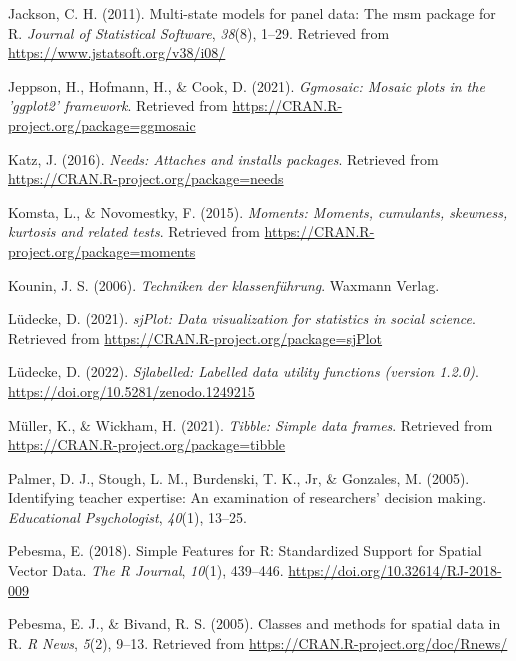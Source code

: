 \documentclass[
  man]{apa6}
\newlength{\cslhangindent}
\newlength{\cslentryspacingunit} %
\newenvironment{CSLReferences}[2] %
 {%
  \setlength{\parindent}{0pt}
  \ifodd #1
  \let\oldpar\par
  \def\par{\hangindent=\cslhangindent\oldpar}
  \fi
  \setlength{\parskip}{#2\cslentryspacingunit}
 }%
 {}
\begin{document}
\begin{CSLReferences}{1}{0}
\leavevmode{}%
Jackson, C. H. (2011). Multi-state models for panel data: The {msm} package for {R}. \emph{Journal of Statistical Software}, \emph{38}(8), 1--29. Retrieved from \url{https://www.jstatsoft.org/v38/i08/}

\leavevmode{}%
Jeppson, H., Hofmann, H., \& Cook, D. (2021). \emph{Ggmosaic: Mosaic plots in the 'ggplot2' framework}. Retrieved from \url{https://CRAN.R-project.org/package=ggmosaic}

\leavevmode{}%
Katz, J. (2016). \emph{Needs: Attaches and installs packages}. Retrieved from \url{https://CRAN.R-project.org/package=needs}

\leavevmode{}%
Komsta, L., \& Novomestky, F. (2015). \emph{Moments: Moments, cumulants, skewness, kurtosis and related tests}. Retrieved from \url{https://CRAN.R-project.org/package=moments}

\leavevmode{}%
Kounin, J. S. (2006). \emph{Techniken der klassenf{ü}hrung}. Waxmann Verlag.

\leavevmode{}%
Lüdecke, D. (2021). \emph{sjPlot: Data visualization for statistics in social science}. Retrieved from \url{https://CRAN.R-project.org/package=sjPlot}

\leavevmode{}%
Lüdecke, D. (2022). \emph{Sjlabelled: Labelled data utility functions (version 1.2.0)}. \url{https://doi.org/10.5281/zenodo.1249215}

\leavevmode{}%
Müller, K., \& Wickham, H. (2021). \emph{Tibble: Simple data frames}. Retrieved from \url{https://CRAN.R-project.org/package=tibble}

\leavevmode{}%
Palmer, D. J., Stough, L. M., Burdenski, T. K., Jr, \& Gonzales, M. (2005). Identifying teacher expertise: An examination of researchers' decision making. \emph{Educational Psychologist}, \emph{40}(1), 13--25.

\leavevmode{}%
Pebesma, E. (2018). {Simple Features for R: Standardized Support for Spatial Vector Data}. \emph{{The R Journal}}, \emph{10}(1), 439--446. \url{https://doi.org/10.32614/RJ-2018-009}

\leavevmode{}%
Pebesma, E. J., \& Bivand, R. S. (2005). Classes and methods for spatial data in {R}. \emph{R News}, \emph{5}(2), 9--13. Retrieved from \url{https://CRAN.R-project.org/doc/Rnews/}


\end{CSLReferences}
\end{document}
